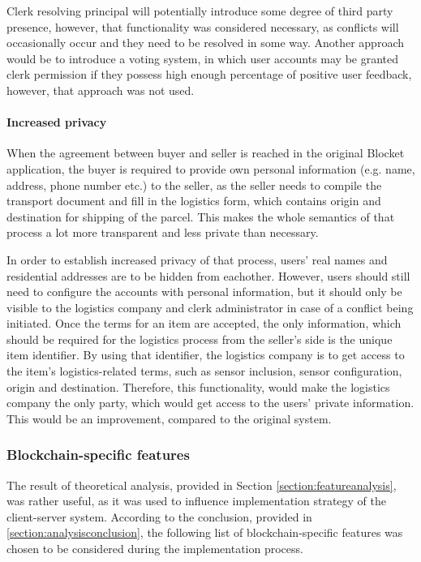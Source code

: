 Clerk resolving principal will potentially introduce some degree of third party presence, however, that functionality was considered necessary, as conflicts will occasionally occur and they need to be resolved in some way. Another approach would be to introduce a voting system, in which user accounts may be granted clerk permission if they possess high enough percentage of positive user feedback, however, that approach was not used.

\paragraph{Increased privacy}
When the agreement between buyer and seller is reached in the original Blocket application, the buyer is required to provide own personal information (e.g. name, address, phone number etc.) to the seller, as the seller needs to compile the transport document and fill in the logistics form, which contains origin and destination for shipping of the parcel. This makes the whole semantics of that process a lot more transparent and less private than necessary.

In order to establish increased privacy of that process, users' real names and residential addresses are to be hidden from eachother. However, users should still need to configure the accounts with personal information, but it should only be visible to the logistics company and clerk administrator in case of a conflict being initiated. Once the terms for an item are accepted, the only information, which should be required for the logistics process from the seller's side is the unique item identifier. By using that identifier, the logistics company is to get access to the item's logistics-related terms, such as sensor inclusion, sensor configuration, origin and destination. Therefore, this functionality, would make the logistics company the only party, which would get access to the users' private information. This would be an improvement, compared to the original system.

\subsubsection{Blockchain-specific features} \label{section:blockchainfeatures}

The result of theoretical analysis, provided in Section \ref{section:featureanalysis}, was rather useful, as it was used to influence implementation strategy of the client-server system. According to the conclusion, provided in \ref{section:analysisconclusion}, the following list of blockchain-specific features was chosen to be considered during the implementation process.

